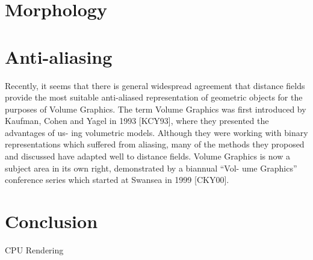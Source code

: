 \chapter{Morphology}

\chapter{Anti-aliasing}
Recently, it seems that there is general widespread agreement that distance fields provide the most suitable anti-aliased representation of geometric objects for the purposes of Volume Graphics. The term Volume Graphics was first introduced by Kaufman, Cohen and Yagel in 1993 [KCY93], where they presented the advantages of us- ing volumetric models. Although they were working with binary representations which suffered from aliasing, many of the methods they proposed and discussed have adapted well to distance fields. Volume Graphics is now a subject area in its own right, demonstrated by a biannual “Vol- ume Graphics” conference series which started at Swansea in 1999 [CKY00].


\chapter{Conclusion}


CPU Rendering